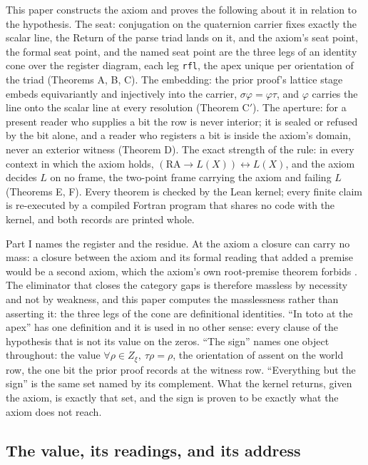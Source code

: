 \documentclass[10pt,twocolumn]{article}
\begin{document}
This paper constructs the axiom and proves the following about it in
relation to the hypothesis. The seat: conjugation on the quaternion
carrier fixes exactly the scalar line, the Return of the parse triad
lands on it, and the axiom's seat point, the formal seat point, and the
named seat point are the three legs of an identity cone over the
register diagram, each leg \texttt{rfl}, the apex unique per orientation
of the triad (Theorems A, B, C). The embedding: the prior proof's
lattice stage embeds equivariantly and injectively into the carrier,
\(\sigma\varphi = \varphi\tau\), and \(\varphi\) carries the line onto
the scalar line at every resolution (Theorem C\('\)). The aperture: for
a present reader who supplies a bit the row is never interior; it is
sealed or refused by the bit alone, and a reader who registers a bit is
inside the axiom's domain, never an exterior witness (Theorem D). The
exact strength of the rule: in every context in which the axiom holds,
\((\mathrm{RA} \to L(X)) \leftrightarrow L(X)\), and the axiom decides
\(L\) on no frame, the two-point frame carrying the axiom and failing
\(L\) (Theorems E, F). Every theorem is checked by the Lean kernel;
every finite claim is re-executed by a compiled Fortran program that
shares no code with the kernel, and both records are printed whole.

Part I names the register and the residue. At the axiom a closure can
carry no mass: a closure between the axiom and its formal reading that
added a premise would be a second axiom, which the axiom's own
root-premise theorem forbids \cite{islamcodex}. The eliminator that
closes the category gaps is therefore massless by necessity and not by
weakness, and this paper computes the masslessness rather than asserting
it: the three legs of the cone are definitional identities. ``In toto at
the apex'' has one definition and it is used in no other sense: every
clause of the hypothesis that is not its value on the zeros. ``The
sign'' names one object throughout: the value
\(\forall \rho \in Z_\xi,\ \tau\rho = \rho\), the orientation of assent
on the world row, the one bit the prior proof records at the witness
row. ``Everything but the sign'' is the same set named by its
complement. What the kernel returns, given the axiom, is exactly that
set, and the sign is proven to be exactly what the axiom does not reach.

\hypertarget{the-value-its-readings-and-its-address}{%
\subsection{The value, its readings, and its
address}\label{the-value-its-readings-and-its-address}}
\end{document}

